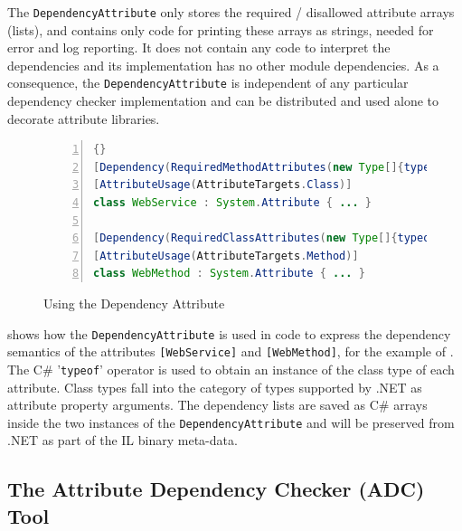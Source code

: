 The \texttt{De\-pen\-den\-cy\-Attri\-bu\-te} only stores the required / disallowed attribute arrays (lists), and contains only code for printing these arrays as strings, needed for error and log reporting. It does not contain any code to interpret the dependencies and its implementation has no other module dependencies. As a consequence, the \texttt{De\-pen\-den\-cy\-Attri\-bu\-te} is independent of any particular dependency checker implementation and can be distributed and used alone to decorate attribute libraries. 


\begin{figure}[ht]
\begin{center}
\begin{minipage}{12cm}
\begin{scriptsize}
\begin{lstlisting}[numbers=left,language=Java,frame=leftline]{}
[Dependency(RequiredMethodAttributes(new Type[]{typeof(WebMethod)})]
[AttributeUsage(AttributeTargets.Class)]
class WebService : System.Attribute { ... }

[Dependency(RequiredClassAttributes(new Type[]{typeof(WebService)})]
[AttributeUsage(AttributeTargets.Method)]
class WebMethod : System.Attribute { ... }
\end{lstlisting}
\end{scriptsize}
\end{minipage}
\end{center}
\caption{Using the Dependency Attribute}
\label{fig:code1}
\end{figure}

 shows how the \texttt{De\-pen\-den\-cy\-Attri\-bu\-te} is used in code to express the dependency semantics of the attributes \texttt{[WebService]} and \texttt{[WebMethod]}, for the example of . The C\# '\texttt{typeof}' operator is used to obtain an instance of the class type of each attribute. Class types fall into the category of types supported by .NET as attribute property arguments. The dependency lists are saved as C\# arrays inside the two instances of the  \texttt{De\-pen\-den\-cy\-Attri\-bu\-te} and will be preserved from .NET as part of the IL binary meta-data.

\subsection{The Attribute Dependency Checker (ADC) Tool}
\label{sec:adc}

